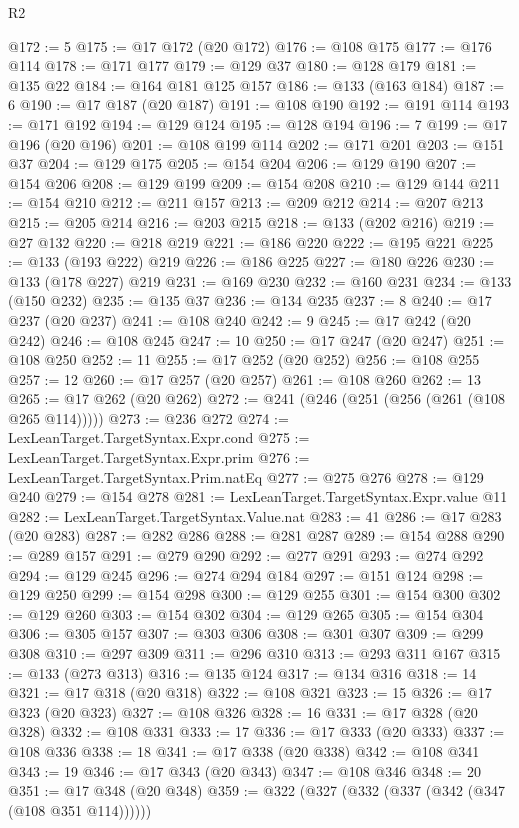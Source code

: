 \begin{lexlean}{R2}
\begin{coremodule}
@172 := 5
@175 := @17 @172 (@20 @172)
@176 := @108 @175
@177 := @176 @114
@178 := @171 @177
@179 := @129 @37
@180 := @128 @179
@181 := @135 @22
@184 := @164 @181 @125 @157
@186 := @133 (@163 @184)
@187 := 6
@190 := @17 @187 (@20 @187)
@191 := @108 @190
@192 := @191 @114
@193 := @171 @192
@194 := @129 @124
@195 := @128 @194
@196 := 7
@199 := @17 @196 (@20 @196)
@201 := @108 @199 @114
@202 := @171 @201
@203 := @151 @37
@204 := @129 @175
@205 := @154 @204
@206 := @129 @190
@207 := @154 @206
@208 := @129 @199
@209 := @154 @208
@210 := @129 @144
@211 := @154 @210
@212 := @211 @157
@213 := @209 @212
@214 := @207 @213
@215 := @205 @214
@216 := @203 @215
@218 := @133 (@202 @216)
@219 := @27 @132
@220 := @218 @219
@221 := @186 @220
@222 := @195 @221
@225 := @133 (@193 @222) @219
@226 := @186 @225
@227 := @180 @226
@230 := @133 (@178 @227) @219
@231 := @169 @230
@232 := @160 @231
@234 := @133 (@150 @232)
@235 := @135 @37
@236 := @134 @235
@237 := 8
@240 := @17 @237 (@20 @237)
@241 := @108 @240
@242 := 9
@245 := @17 @242 (@20 @242)
@246 := @108 @245
@247 := 10
@250 := @17 @247 (@20 @247)
@251 := @108 @250
@252 := 11
@255 := @17 @252 (@20 @252)
@256 := @108 @255
@257 := 12
@260 := @17 @257 (@20 @257)
@261 := @108 @260
@262 := 13
@265 := @17 @262 (@20 @262)
@272 := @241 (@246 (@251 (@256 (@261 (@108 @265 @114)))))
@273 := @236 @272
@274 := LexLeanTarget.TargetSyntax.Expr.cond
@275 := LexLeanTarget.TargetSyntax.Expr.prim
@276 := LexLeanTarget.TargetSyntax.Prim.natEq
@277 := @275 @276
@278 := @129 @240
@279 := @154 @278
@281 := LexLeanTarget.TargetSyntax.Expr.value @11
@282 := LexLeanTarget.TargetSyntax.Value.nat
@283 := 41
@286 := @17 @283 (@20 @283)
@287 := @282 @286
@288 := @281 @287
@289 := @154 @288
@290 := @289 @157
@291 := @279 @290
@292 := @277 @291
@293 := @274 @292
@294 := @129 @245
@296 := @274 @294 @184
@297 := @151 @124
@298 := @129 @250
@299 := @154 @298
@300 := @129 @255
@301 := @154 @300
@302 := @129 @260
@303 := @154 @302
@304 := @129 @265
@305 := @154 @304
@306 := @305 @157
@307 := @303 @306
@308 := @301 @307
@309 := @299 @308
@310 := @297 @309
@311 := @296 @310
@313 := @293 @311 @167
@315 := @133 (@273 @313)
@316 := @135 @124
@317 := @134 @316
@318 := 14
@321 := @17 @318 (@20 @318)
@322 := @108 @321
@323 := 15
@326 := @17 @323 (@20 @323)
@327 := @108 @326
@328 := 16
@331 := @17 @328 (@20 @328)
@332 := @108 @331
@333 := 17
@336 := @17 @333 (@20 @333)
@337 := @108 @336
@338 := 18
@341 := @17 @338 (@20 @338)
@342 := @108 @341
@343 := 19
@346 := @17 @343 (@20 @343)
@347 := @108 @346
@348 := 20
@351 := @17 @348 (@20 @348)
@359 := @322 (@327 (@332 (@337 (@342 (@347 (@108 @351 @114))))))

\end{coremodule}
\end{lexlean}
